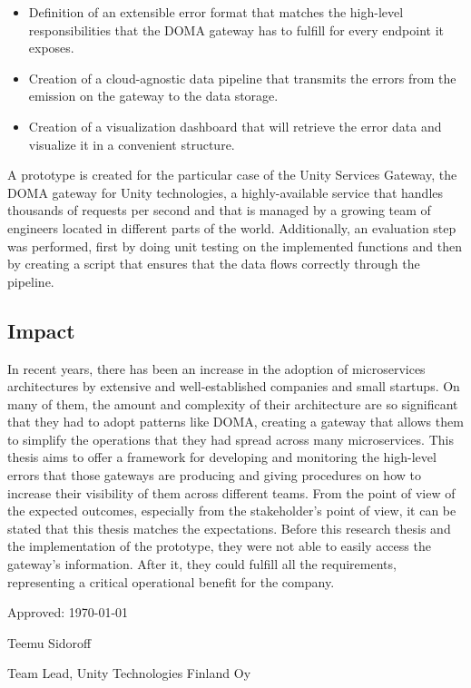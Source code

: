 \documentclass[12pt]{article}
\begin{document}
\begin{itemize}
    \item Definition of an extensible error format that matches the high-level responsibilities that the DOMA gateway has to fulfill for every endpoint it exposes.
    \item Creation of a cloud-agnostic data pipeline that transmits the errors from the emission on the gateway to the data storage.
    \item Creation of a visualization dashboard that will retrieve the error data and visualize it in a convenient structure.
\end{itemize}

A prototype is created for the particular case of the Unity Services Gateway, the DOMA gateway for Unity technologies, a highly-available service that handles thousands of requests per second and that is managed by a growing team of engineers located in different parts of the world. Additionally, an evaluation step was performed, first by doing unit testing on the implemented functions and then by creating a script that ensures that the data flows correctly through the pipeline.

\subsection{Impact}

In recent years, there has been an increase in the adoption of microservices architectures by extensive and well-established companies and small startups. On many of them, the amount and complexity of their architecture are so significant that they had to adopt patterns like DOMA, creating a gateway that allows them to simplify the operations that they had spread across many microservices. This thesis aims to offer a framework for developing and monitoring the high-level errors that those gateways are producing and giving procedures on how to increase their visibility of them across different teams. From the point of view of the expected outcomes, especially from the stakeholder's point of view, it can be stated that this thesis matches the expectations. Before this research thesis and the implementation of the prototype, they were not able to easily access the gateway's information. After it, they could fulfill all the requirements, representing a critical operational benefit for the company.\\

\vspace{15cm}

Approved: \hrulefill \today

\hspace*{0mm}\phantom{Approved: }Teemu Sidoroff

\hspace*{0mm}\phantom{Approved: }Team Lead, Unity Technologies Finland Oy
\end{document}
